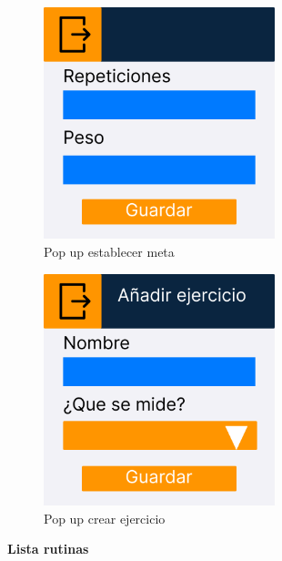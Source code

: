 \begin{figure}[H]
   \centering
    \includegraphics[width=0.6\textwidth]{fotos/Frame 45.png}
    \caption{Pop up establecer meta}
    \label{fig:Pop up establecer meta}
\end{figure}
\begin{figure}[H]
   \centering
    \includegraphics[width=0.6\textwidth]{fotos/Frame 64.png}
    \caption{Pop up crear ejercicio}
    \label{fig:Pop up crear ejercicio}
\end{figure}

\textbf{Lista rutinas}

